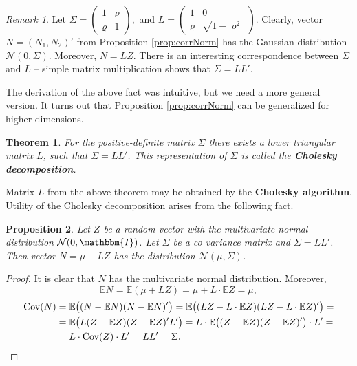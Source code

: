 \documentclass[a4paper,11pt, twoside]{book}
\newtheorem{thm}{Theorem}[chapter]
\newtheorem{prop}[thm]{Proposition}
\theoremstyle{definition}
\theoremstyle{remark}
\newtheorem{remark}{Remark}[chapter]
\def\E{{\mathbb{E}}}
\def\Cov{{\hbox{Cov}}}
\begin{document}
\begin{remark}
 Let $\Sigma = \left( \begin{array}{cc}
                    1    & \varrho \\
                    \varrho & 1
                    \end{array} \right),$
  and $L = \left( \begin{array}{cc}
                    1    & 0 \\
                    \varrho & \sqrt{1 - \varrho^2}
                    \end{array} \right).$
 Clearly, vector $N = (N_1, N_2)'$ from Proposition \ref{prop:corrNorm} has the Gaussian distribution $\mathcal{N}(0, \Sigma)$. Moreover, $N = LZ$. There is an interesting correspondence between $\Sigma$ and $L$ -- simple matrix multiplication shows that $\Sigma = LL'$.  
\end{remark}

The derivation of the above fact was intuitive, but we need a more general version. It turns out that Proposition \ref{prop:corrNorm} can be generalized for higher dimensions.
\begin{thm}
 For the positive-definite matrix $\Sigma$ there exists a lower triangular matrix $L$, such that $\Sigma = LL'$. This representation of $\Sigma$ is called the \textbf{Cholesky decomposition}.
\end{thm}
Matrix $L$ from the above theorem may be obtained by the \textbf{Cholesky algorithm}. Utility of the Cholesky decomposition arises from the following fact.
\begin{prop}
 Let $Z$ be a random vector with the multivariate normal distribution $\mathcal{N}(0, \mathbbm{I})$. Let $\Sigma$ be a co variance matrix and $\Sigma = LL'$. Then vector $N = \mu + LZ$ has the distribution $\mathcal{N}(\mu, \Sigma)$.
\end{prop}
\begin{proof}
 It is clear that $N$ has the multivariate normal distribution. Moreover,
 \[ \E N = \E(\mu + LZ) = \mu + L\cdot\E Z = \mu, \]
 \begin{equation*}
  \begin{split}
 \Cov(N) &= \E \bigl( (N - \E N) (N - \E N)' \bigr) = \E \bigl( (LZ - L\cdot \E Z) (LZ - L\cdot \E Z)' \bigr) =\\
         &= \E \bigl( L(Z - \E Z) (Z - \E Z)'L' \bigr) = L\cdot \E \bigl( (Z - \E Z) (Z - \E Z)' \bigr) \cdot L' =\\
         &= L\cdot \Cov(Z) \cdot L'= LL' = \Sigma.   
  \end{split}
 \end{equation*}
\end{proof}
\end{document}

